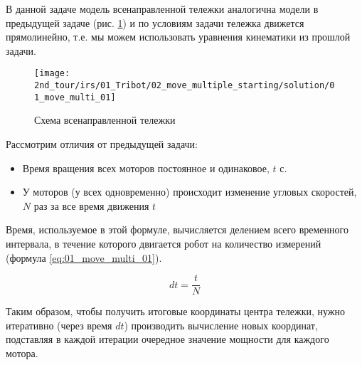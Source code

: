 \solutionSection

В данной задаче модель всенаправленной тележки аналогична модели в предыдущей задаче (рис. \ref{fig:01_move_multi_01}) и по условиям задачи тележка движется прямолинейно, т.е. мы можем использовать уравнения кинематики из прошлой задачи. 

\begin{figure}[H]
	\centering
	\texttt{[image: 2nd\_tour/irs/01\_Tribot/02\_move\_multiple\_starting/solution/01\_move\_multi\_01]}
	\caption{Схема всенаправленной тележки}
	\label{fig:01_move_multi_01}
\end{figure}

Рассмотрим отличия от предыдущей задачи:
\begin{itemize}
	\item Время вращения всех моторов постоянное и одинаковое, $t$ с.
	\item У моторов (у всех одновременно) происходит изменение угловых скоростей, $N$ раз за все время движения $t$
\end{itemize}

Время, используемое в этой формуле, вычисляется делением всего временного интервала, в течение которого двигается робот на количество измерений (формула \ref{eq:01_move_multi_01}).

\begin{equation}
	dt = \frac{t}{N}
	\label{eq:01_move_multi_01}
\end{equation}

Таким образом, чтобы получить итоговые координаты центра тележки, нужно итеративно (через время $dt$) производить вычисление новых координат, подставляя в каждой итерации очередное значение мощности для каждого мотора.

\codeExample

{}